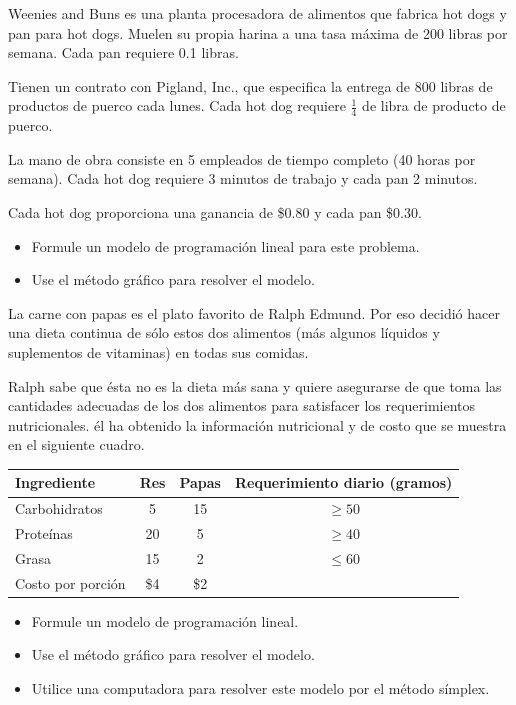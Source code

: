 \begin{Ejer}  Weenies and Buns es una planta procesadora de alimentos que fabrica hot dogs y pan para hot dogs. Muelen su propia harina a una tasa m\'axima de 200 libras por semana. Cada pan requiere 0.1 libras.

Tienen un contrato con Pigland, Inc., que especifica la entrega de 800 libras de productos de puerco cada lunes. Cada hot dog requiere $\tfrac14$ de libra de producto de puerco.

La mano de obra consiste en 5 empleados de tiempo completo (40 horas por semana). Cada hot dog requiere 3 minutos de trabajo y cada pan 2 minutos.

Cada hot dog proporciona una ganancia de \$0.80 y cada pan \$0.30.

\begin{itemize}
\item[a)] Formule un modelo de programaci\'on lineal para este problema.
\item[b)] Use el m\'etodo gr\'afico para resolver el modelo.
\end{itemize}


\end{Ejer}

\begin{Ejer} La carne con papas es el plato favorito de Ralph Edmund. Por eso decidi\'o hacer una dieta continua de s\'olo estos dos alimentos (m\'as algunos l\'iquidos y suplementos de vitaminas) en todas sus comidas.

Ralph sabe que \'esta no es la dieta m\'as sana y quiere asegurarse de que toma las cantidades adecuadas de los dos alimentos para satisfacer los requerimientos nutricionales. \'el ha obtenido la informaci\'on nutricional y de costo que se muestra en el siguiente cuadro.

\begin{center}
\begin{tabular}{lccc}
Ingrediente & Res & Papas & Requerimiento diario (gramos) \\
\hline
Carbohidratos & 5 & 15 & $\ge 50$ \\
Prote\'inas & 20 & 5 & $\ge 40$ \\
Grasa & 15 & 2 & $\le 60$ \\
\hline
Costo por porci\'on & \$4 & \$2 &
\end{tabular}
\end{center}

\begin{itemize}
\item[a)] Formule un modelo de programaci\'on lineal.
\item[b)] Use el m\'etodo gr\'afico para resolver el modelo.
\item[c)] Utilice una computadora para resolver este modelo por el m\'etodo s\'implex.
\end{itemize}


\end{Ejer}


